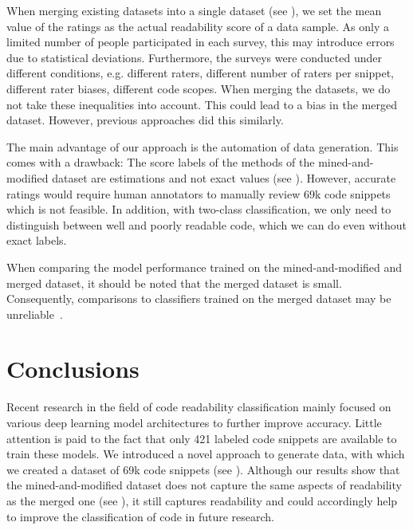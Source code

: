 \documentclass[%
class=scrreprt,
chapterprefix=false,%
open=right,%
twoside=false,%
paper=a4,%
logofile={Logo\_zentral\_farbig\_EN.png},%
thesistype=master,%
UKenglish,%
]{se2thesis}
\theoremstyle{definition}
\newcommand{\citeolddataset}{\cite{buse2009learning, dorn2012general, scalabrino2018comprehensive}\xspace}
\newcommand{\numSamples}{69k\xspace}
\begin{document}
	When merging existing datasets \citeolddataset into a single dataset (see ), we set the mean value of the ratings as the actual readability score of a data sample. As only a limited number of people participated in each survey, this may introduce errors due to statistical deviations.
	Furthermore, the surveys were conducted under different conditions, e.g. different raters, different number of raters per snippet, different rater biases, different code scopes. When merging the datasets, we do not take these inequalities into account. This could lead to a bias in the merged dataset. However, previous approaches did this similarly.
	
	The main advantage of our approach is the automation of data generation.
	This comes with a drawback: The score labels of the methods of the mined-and-modified dataset are estimations and not exact values (see ). However, accurate ratings would require human annotators to manually review \numSamples code snippets which is not feasible. In addition, with two-class classification, we only need to distinguish between well and poorly readable code, which we can do even without exact labels.
	
	When comparing the model performance trained on the mined-and-modified and merged dataset, it should be noted that the merged dataset is small. Consequently, comparisons to classifiers trained on the merged dataset may be unreliable~\cite{mi2022towards}.
	
\section{Conclusions} \label{Conclusions}
	Recent research in the field of code readability classification mainly focused on various deep learning model architectures to further improve accuracy. Little attention is paid to the fact that only 421 labeled code snippets are available to train these models. We introduced a novel approach to generate data, with which we created a dataset of \numSamples code snippets (see ). Although our results show that the  mined-and-modified dataset does not capture the same aspects of readability as the merged one (see ), it still captures readability and could accordingly help to improve the classification of code in future research.
	
\end{document}
